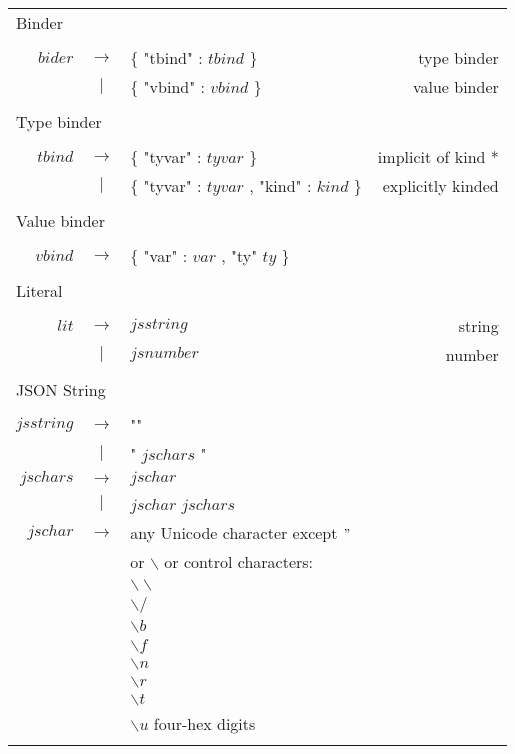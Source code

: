 \begin{footnotesize}
\begin{longtable}{ r c l r }
\multicolumn{4}{l}{Binder}			 \\
\\[0.01in]
$bider$		& $ \rightarrow $	& $\{$ "tbind" : $tbind$ $\}$											& type binder		\\
		& $ | $			& $\{$ "vbind" : $vbind$ $\}$											& value binder		\\
\\[0.01in]

\multicolumn{4}{l}{Type binder}			 \\
\\[0.01in]
$tbind$		& $ \rightarrow $	& $\{$ "tyvar" : $tyvar$ $\}$											& implicit of kind * 	\\
		& $ | $			& $\{$ "tyvar" : $tyvar$ , "kind" : $kind$ $\}$									& explicitly kinded	\\
\\[0.01in]

\multicolumn{4}{l}{Value binder}			 \\
\\[0.01in]
$vbind$		& $ \rightarrow $	& $\{$ "var" : $var$ , "ty" $ty$ $\}$ 										& \\
\\[0.01in]

\multicolumn{4}{l}{Literal}			 \\
\\[0.01in]
$lit$		& $ \rightarrow $	& $jsstring$													& string 		\\ 
		& $ | $			& $jsnumber$													& number		\\
\\[0.01in]

\multicolumn{4}{l}{JSON String}			 \\
\\[0.01in]
$jsstring$	& $ \rightarrow $	& ""														& \\
		& $ | $			& " $jschars$ "													& \\
$jschars$	& $ \rightarrow $	& $jschar$													& \\
		& $ | $			& $jschar$ $jschars$												& \\
$jschar$	& $ \rightarrow $	& any Unicode character except $"$ 										& \\ 
		&			& or $\backslash$ or control characters: 									& \\
		&			& $\backslash\backslash$											& \\
		&			& $\backslash /$ 												& \\
		&			& $\backslash b$ 												& \\
		& 			& $\backslash f$ 												& \\
		&			& $\backslash n$												& \\
		& 			& $\backslash r$ 												& \\
		&			& $\backslash t$ 												& \\
		& 			& $\backslash u$ four-hex digits\\
\\[0.01in]


\end{longtable}
\end{footnotesize}
